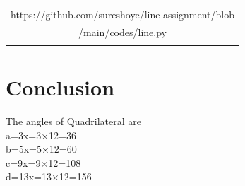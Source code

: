 \documentclass[journal,10pt,twocolumn]{article}
\begin{document}
\begin{table}[h]
\centering
\begin{tabular}{|c|} \hline
\rule{0pt}{10pt} 
https://github.com/sureshoye/line-assignment/blob \\
/main/codes/line.py\\
\\\hline
 \end{tabular}
\end{table}




\section{Conclusion}
\begin{flushleft}
The angles of Quadrilateral are\\
\vspace{0.25cm}
a=3x=3×12=36\textdegree\\
\vspace{0.25cm}
b=5x=5×12=60\textdegree\\
\vspace{0.25cm}
c=9x=9×12=108\textdegree\\
\vspace{0.25cm}
d=13x=13×12=156\textdegree
\end{flushleft}
\endcenter
\end{document}
